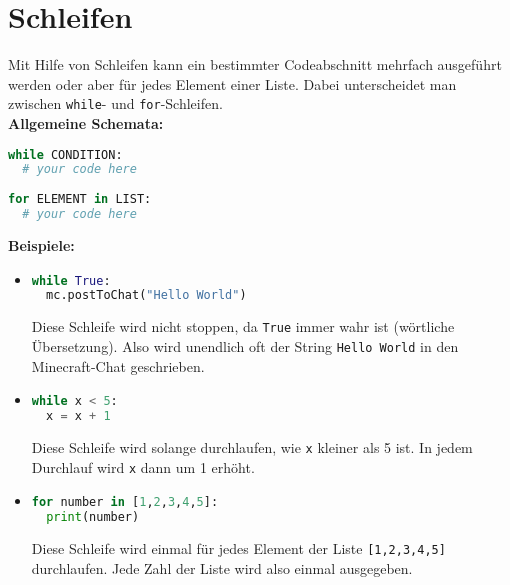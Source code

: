 \documentclass{article}
\begin{document}
	\section{Schleifen}
	Mit Hilfe von Schleifen kann ein bestimmter Codeabschnitt mehrfach ausgeführt werden oder aber für jedes Element einer Liste. Dabei unterscheidet man zwischen \texttt{while}- und \texttt{for}-Schleifen.\\
	\textbf{Allgemeine Schemata:}
	\begin{lstlisting}[language=Python]
while CONDITION:
  # your code here
	
for ELEMENT in LIST:
  # your code here
	\end{lstlisting}
	\textbf{Beispiele:}
	\begin{itemize}
		\item[] \begin{lstlisting}[language=Python]
while True:
  mc.postToChat("Hello World")
		\end{lstlisting}
		Diese Schleife wird nicht stoppen, da \texttt{True} immer wahr ist (wörtliche Übersetzung). Also wird unendlich oft der String \texttt{Hello World} in den Minecraft-Chat geschrieben.
		
		\item[] \begin{lstlisting}[language=Python]
while x < 5:
  x = x + 1
		\end{lstlisting}
		Diese Schleife wird solange durchlaufen, wie \texttt{x} kleiner als 5 ist. In jedem Durchlauf wird \texttt{x} dann um 1 erhöht.
		
		\item[] \begin{lstlisting}[language=Python]
for number in [1,2,3,4,5]:
  print(number)
		\end{lstlisting}
		Diese Schleife wird einmal für jedes Element der Liste \texttt{[1,2,3,4,5]} durchlaufen. Jede Zahl der Liste wird also einmal ausgegeben.
	\end{itemize}
\end{document}
